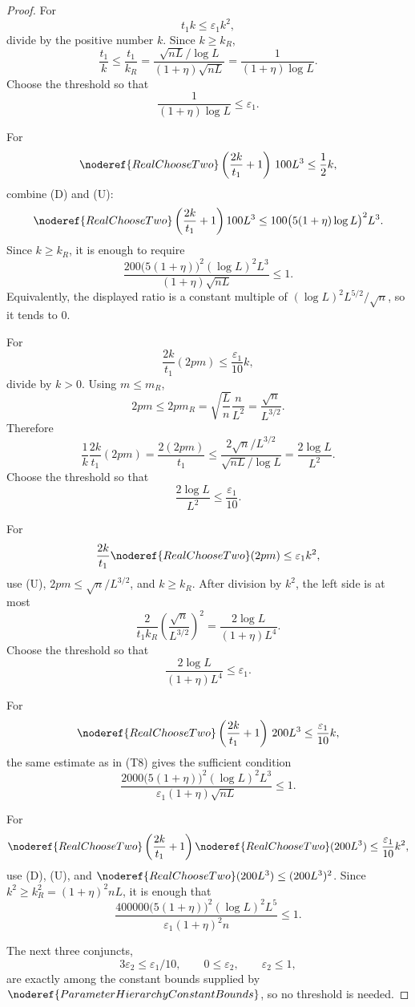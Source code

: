 \begin{proof}
For
\[
t_1k\le \varepsilon_1 k^2,
\]
divide by the positive number \(k\).  Since \(k\ge k_R\),
\[
\frac{t_1}{k}\le\frac{t_1}{k_R}
=\frac{\sqrt{nL}/\log L}{(1+\eta)\sqrt{nL}}
=\frac1{(1+\eta)\log L}.
\]
Choose the threshold so that
\[
\frac1{(1+\eta)\log L}\le\varepsilon_1. \tag{T7}
\]

For
\[
\noderef{RealChooseTwo}\left(\frac{2k}{t_1}+1\right)\,100L^3
\le \frac12 k,
\]
combine (D) and (U):
\[
\noderef{RealChooseTwo}\left(\frac{2k}{t_1}+1\right)100L^3
\le 100\bigl(5(1+\eta)\log L\bigr)^2L^3.
\]
Since \(k\ge k_R\), it is enough to require
\[
\frac{200\bigl(5(1+\eta)\bigr)^2(\log L)^2L^3}
{(1+\eta)\sqrt{nL}}\le1. \tag{T8}
\]
Equivalently, the displayed ratio is a constant multiple of
\((\log L)^2L^{5/2}/\sqrt n\), so it tends to \(0\).

For
\[
\frac{2k}{t_1}(2pm)\le \frac{\varepsilon_1}{10}k,
\]
divide by \(k>0\).  Using \(m\le m_R\),
\[
2pm\le 2p m_R
=\sqrt{\frac Ln}\frac n{L^2}
=\frac{\sqrt n}{L^{3/2}}.
\]
Therefore
\[
\frac{1}{k}\frac{2k}{t_1}(2pm)
=\frac{2(2pm)}{t_1}
\le
\frac{2\sqrt n/L^{3/2}}{\sqrt{nL}/\log L}
=\frac{2\log L}{L^2}.
\]
Choose the threshold so that
\[
\frac{2\log L}{L^2}\le\frac{\varepsilon_1}{10}. \tag{T9}
\]

For
\[
\frac{2k}{t_1}\noderef{RealChooseTwo}(2pm)\le\varepsilon_1 k^2,
\]
use (U), \(2pm\le\sqrt n/L^{3/2}\), and \(k\ge k_R\).  After division by
\(k^2\), the left side is at most
\[
\frac{2}{t_1k_R}\left(\frac{\sqrt n}{L^{3/2}}\right)^2
=
\frac{2\log L}{(1+\eta)L^4}.
\]
Choose the threshold so that
\[
\frac{2\log L}{(1+\eta)L^4}\le\varepsilon_1. \tag{T10}
\]

For
\[
\noderef{RealChooseTwo}\left(\frac{2k}{t_1}+1\right)\,200L^3
\le \frac{\varepsilon_1}{10}k,
\]
the same estimate as in (T8) gives the sufficient condition
\[
\frac{2000\bigl(5(1+\eta)\bigr)^2(\log L)^2L^3}
{\varepsilon_1(1+\eta)\sqrt{nL}}\le1. \tag{T11}
\]

For
\[
\noderef{RealChooseTwo}\left(\frac{2k}{t_1}+1\right)
\noderef{RealChooseTwo}(200L^3)
\le \frac{\varepsilon_1}{10}k^2,
\]
use (D), (U), and
\(\noderef{RealChooseTwo}(200L^3)\le(200L^3)^2\).  Since
\(k^2\ge k_R^2=(1+\eta)^2nL\), it is enough that
\[
\frac{400000\bigl(5(1+\eta)\bigr)^2(\log L)^2L^5}
{\varepsilon_1(1+\eta)^2 n}\le1. \tag{T12}
\]

The next three conjuncts,
\[
3\varepsilon_2\le\varepsilon_1/10,\qquad
0\le\varepsilon_2,\qquad \varepsilon_2\le1,
\]
are exactly among the constant bounds supplied by
\(\noderef{ParameterHierarchyConstantBounds}\), so no threshold is needed.


\end{proof}
